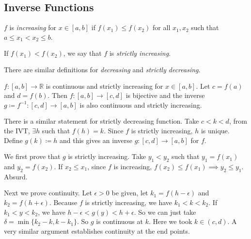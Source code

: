 \subsection{Inverse Functions}
\leavevmode
\begin{definition}
    \(f\) is \textit{increasing} for \(x \in [a,b]\) if \(f(x_1) \leq f(x_2)\) for all \(x_1, x_2\) such that \(a\leq x_1 < x_2 \leq b\).

    If \(f(x_1) < f(x_2)\), we say that \(f\) is \textit{strictly increasing}.

    There are similar definitions for \textit{decreasing} and \textit{strictly decreasing}.
\end{definition}
\begin{theorem}
    \label{betainv}
    \(f: [a,b] \to \mathbb{R}\) is continuous and strictly increasing for \(x \in [a,b]\). Let \( c = f(a)\) and \(d = f(b)\). Then \(f: [a,b] \to [c,d]\) is bijective and the inverse \(g\coloneqq f^{-1}:[c,d] \to [a,b]\) is also continuous and strictly increasing.
\end{theorem}
\begin{remark}
    There is a similar statement for strictly decreasing function. Take \(c < k < d\), from the IVT, \(\exists h \) such that \(f(h) = k\). Since \(f\) is strictly increasing, \(h\) is unique. Define \(g(k) \coloneqq h\) and this gives an inverse \(g: [c,d] \to [a,b]\) for \(f\).

    We first prove that \(g\) is strictly increasing. Take \(y_1 < y_2\) such that \(y_1 = f(x_1)\) and \(y_2 = f(x_2)\). If \(x_2 \leq x_1\), since \(f\) is increasing, \(f(x_2) \leq  f(x_1) \implies y_2 \leq y_1\). Absurd.

    Next we prove continuity. Let \(\epsilon >0\) be given, let \(k_1 = f(h - \epsilon)\) and \(k_2 = f(h + \epsilon)\). Because \(f\) is strictly increasing, we have \( k_1 < k < k_2\). If \(k_1 < y<k_2\), we have \(h-\epsilon<g(y) < h + \epsilon\). So we can just take \(\delta=\min\{k_2 - k, k-k_1\}\). So \(g\) is continuous at \(k\). Here we took \(k \in (c,d)\). A very similar argument establishes continuity at the end points.
\end{remark}
